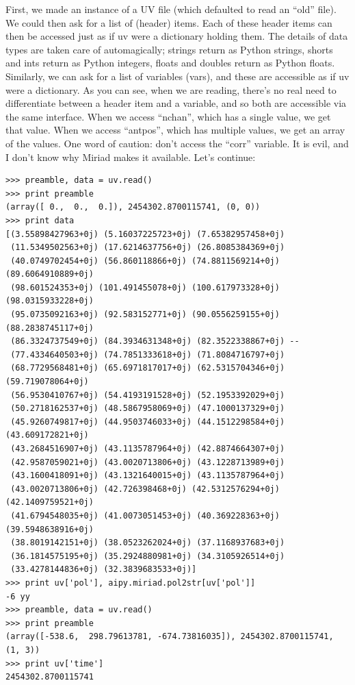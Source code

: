 First, we made an instance of a UV file (which defaulted to read an ``old''
file).  We could then ask for a list of (header) items.  Each of these header
items can then be accessed just as if uv were a dictionary holding them.  The
details of data types are taken care of automagically; strings return as Python
strings, shorts and ints return as Python integers, floats and doubles return
as Python floats.  Similarly, we can ask for a list of variables (vars), and
these are accessible as if uv were a dictionary.  As you can see, when we are
reading, there's no real need to differentiate between a header item and a
variable, and so both are accessible via the same interface.  When we access
``nchan'', which has a single value, we get that value.  When we access
``antpos'', which has multiple values, we get an array of the values.
One word of caution: don't access the ``corr'' variable.  It is evil, and
I don't know why Miriad makes it available.  Let's continue:

\begin{verbatim}
>>> preamble, data = uv.read()
>>> print preamble
(array([ 0.,  0.,  0.]), 2454302.8700115741, (0, 0))
>>> print data
[(3.55898427963+0j) (5.16037225723+0j) (7.65382957458+0j)
 (11.5349502563+0j) (17.6214637756+0j) (26.8085384369+0j)
 (40.0749702454+0j) (56.860118866+0j) (74.8811569214+0j) (89.6064910889+0j)
 (98.601524353+0j) (101.491455078+0j) (100.617973328+0j) (98.0315933228+0j)
 (95.0735092163+0j) (92.583152771+0j) (90.0556259155+0j) (88.2838745117+0j)
 (86.3324737549+0j) (84.3934631348+0j) (82.3522338867+0j) --
 (77.4334640503+0j) (74.7851333618+0j) (71.8084716797+0j)
 (68.7729568481+0j) (65.6971817017+0j) (62.5315704346+0j) (59.719078064+0j)
 (56.9530410767+0j) (54.4193191528+0j) (52.1953392029+0j)
 (50.2718162537+0j) (48.5867958069+0j) (47.1000137329+0j)
 (45.9260749817+0j) (44.9503746033+0j) (44.1512298584+0j) (43.609172821+0j)
 (43.2684516907+0j) (43.1135787964+0j) (42.8874664307+0j)
 (42.9587059021+0j) (43.0020713806+0j) (43.1228713989+0j)
 (43.1600418091+0j) (43.1321640015+0j) (43.1135787964+0j)
 (43.0020713806+0j) (42.726398468+0j) (42.5312576294+0j) (42.1409759521+0j)
 (41.6794548035+0j) (41.0073051453+0j) (40.369228363+0j) (39.5948638916+0j)
 (38.8019142151+0j) (38.0523262024+0j) (37.1168937683+0j)
 (36.1814575195+0j) (35.2924880981+0j) (34.3105926514+0j)
 (33.4278144836+0j) (32.3839683533+0j)]
>>> print uv['pol'], aipy.miriad.pol2str[uv['pol']]
-6 yy
>>> preamble, data = uv.read()
>>> print preamble
(array([-538.6,  298.79613781, -674.73816035]), 2454302.8700115741, (1, 3))
>>> print uv['time']
2454302.8700115741
\end{verbatim}

